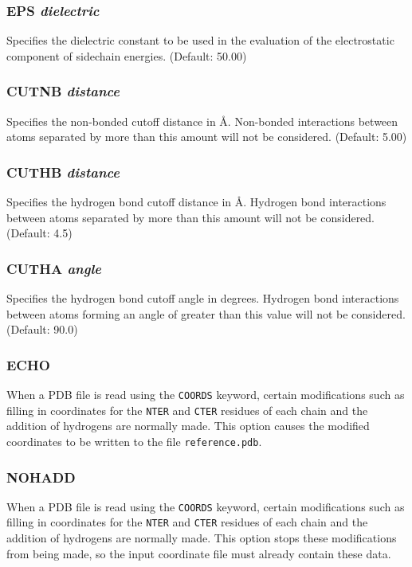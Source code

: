 \documentclass{report}
\newcommand{\ang}{\AA}
\begin{document}
\subsubsection{EPS {\em dielectric}}
Specifies the dielectric constant to be used in the evaluation of the 
electrostatic component of sidechain energies. (Default: 50.00)

\subsubsection{CUTNB {\em distance}}
Specifies the non-bonded cutoff distance in \ang. Non-bonded interactions
between atoms separated by more than this amount will not be considered.
(Default: 5.00)

\subsubsection{CUTHB {\em distance}}
Specifies the hydrogen bond cutoff distance in \ang. Hydrogen bond interactions
between atoms separated by more than this amount will not be considered.
(Default: 4.5)

\subsubsection{CUTHA {\em angle}}
Specifies the hydrogen bond cutoff angle in degrees. Hydrogen bond interactions
between atoms forming an angle of greater than this value will not be 
considered. (Default: 90.0)

\subsubsection{ECHO}
When a PDB file is read using the {\tt COORDS} keyword, certain modifications
such as filling in coordinates for the {\tt NTER} and {\tt CTER} residues 
of each chain
and the addition of hydrogens are normally made. This option causes the 
modified coordinates to be written to the file {\tt reference.pdb}.

\subsubsection{NOHADD}
When a PDB file is read using the {\tt COORDS} keyword, certain modifications
such as filling in coordinates for the {\tt NTER} and {\tt CTER} residues 
of each chain
and the addition of hydrogens are normally made. This option stops these
modifications from being made, so the input coordinate file must already
contain these data.
\end{document}
